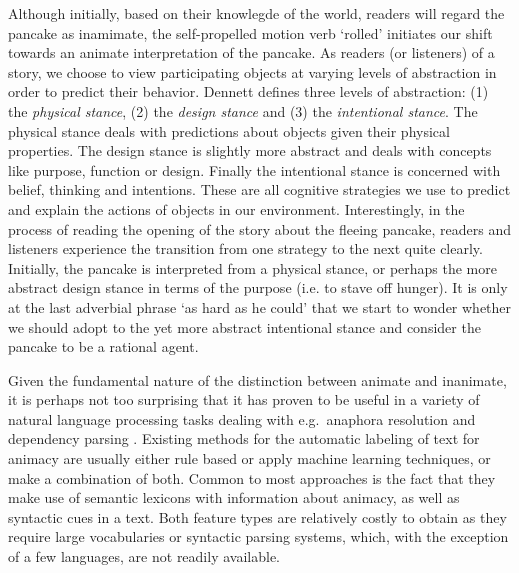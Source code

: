 \documentclass[a4paper,UKenglish]{oasics}
\begin{document}
Although initially, based on their knowlegde of the world, readers
will regard the pancake as inamimate, the self-propelled motion verb
`rolled' initiates our shift towards an animate interpretation of the
pancake. As readers (or listeners) of a story, we choose to view
participating objects at varying levels of abstraction in order to
predict their behavior. Dennett \cite{dennett:96} defines three levels
of abstraction: (1) the \textit{physical stance}, (2) the
\textit{design stance} and (3) the \textit{intentional stance}. The
physical stance deals with predictions about objects given their
physical properties. The design stance is slightly more abstract and
deals with concepts like purpose, function or design. Finally the
intentional stance is concerned with belief, thinking and
intentions. These are all cognitive strategies we use to predict and
explain the actions of objects in our environment. Interestingly, in
the process of reading the opening of the story about the fleeing
pancake, readers and listeners experience the transition from one
strategy to the next quite clearly. Initially, the pancake is
interpreted from a physical stance, or perhaps the more abstract
design stance in terms of the purpose (i.e. to stave off hunger). It
is only at the last adverbial phrase `as hard as he could' that we
start to wonder whether we should adopt to the yet more abstract
intentional stance and consider the pancake to be a rational agent.

Given the fundamental nature of the distinction between animate and
inanimate, it is perhaps not too surprising that it has proven to be
useful in a variety of natural language processing tasks dealing with
e.g.\ anaphora resolution and dependency parsing
\cite{orasan:07,lee:13,ovr:niv:07}. Existing methods for the automatic
labeling of text for animacy are usually either rule based or apply
machine learning techniques, or make a combination of both. Common to
most approaches is the fact that they make use of semantic lexicons
with information about animacy, as well as syntactic cues in a
text. Both feature types are relatively costly to obtain as they
require large vocabularies or syntactic parsing systems, which, with
the exception of a few languages, are not readily available.
\end{document}
